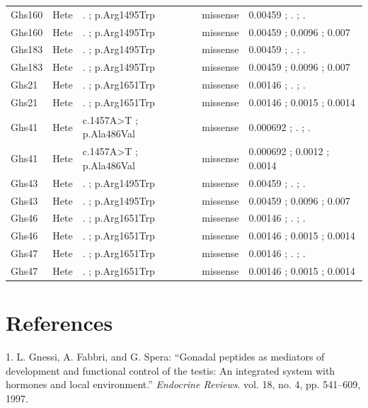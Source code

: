 \documentclass[12pt,twoside]{reedthesis}
\theoremstyle{definition}
\theoremstyle{definition}
\theoremstyle{remark}
\begin{document}
\begin{landscape}
\begin{longtable}[t]{lllll}
  Ghs160 & Hete & . ; p.Arg1495Trp & missense & 0.00459 ; . ; .\\
  \addlinespace
  Ghs160 & Hete & . ; p.Arg1495Trp & missense & 0.00459 ; 0.0096 ; 0.007\\
  Ghs183 & Hete & . ; p.Arg1495Trp & missense & 0.00459 ; . ; .\\
  Ghs183 & Hete & . ; p.Arg1495Trp & missense & 0.00459 ; 0.0096 ; 0.007\\
  Ghs21 & Hete & . ; p.Arg1651Trp & missense & 0.00146 ; . ; .\\
  Ghs21 & Hete & . ; p.Arg1651Trp & missense & 0.00146 ; 0.0015 ; 0.0014\\
  \addlinespace
  Ghs41 & Hete & c.1457A>T ; p.Ala486Val & missense & 0.000692 ; . ; .\\
  Ghs41 & Hete & c.1457A>T ; p.Ala486Val & missense & 0.000692 ; 0.0012 ; 0.0014\\
  Ghs43 & Hete & . ; p.Arg1495Trp & missense & 0.00459 ; . ; .\\
  Ghs43 & Hete & . ; p.Arg1495Trp & missense & 0.00459 ; 0.0096 ; 0.007\\
  Ghs46 & Hete & . ; p.Arg1651Trp & missense & 0.00146 ; . ; .\\
  \addlinespace
  Ghs46 & Hete & . ; p.Arg1651Trp & missense & 0.00146 ; 0.0015 ; 0.0014\\
  Ghs47 & Hete & . ; p.Arg1651Trp & missense & 0.00146 ; . ; .\\
  Ghs47 & Hete & . ; p.Arg1651Trp & missense & 0.00146 ; 0.0015 ; 0.0014\\
  \bottomrule
  \end{longtable}
  \end{landscape}
  
  \backmatter
  
  \chapter*{References}\label{references}
  
  \noindent
  
  \setlength{\parindent}{-0.20in} \setlength{\leftskip}{0.20in}
  \setlength{\parskip}{8pt}
  
  \hypertarget{refs}{}
  \hypertarget{ref-Gnessi1997}{}
  1. L. Gnessi, A. Fabbri, and G. Spera: ``Gonadal peptides as mediators
  of development and functional control of the testis: An integrated
  system with hormones and local environment.'' \emph{Endocrine Reviews}.
  vol. 18, no. 4, pp. 541--609, 1997.
  
\end{document}
